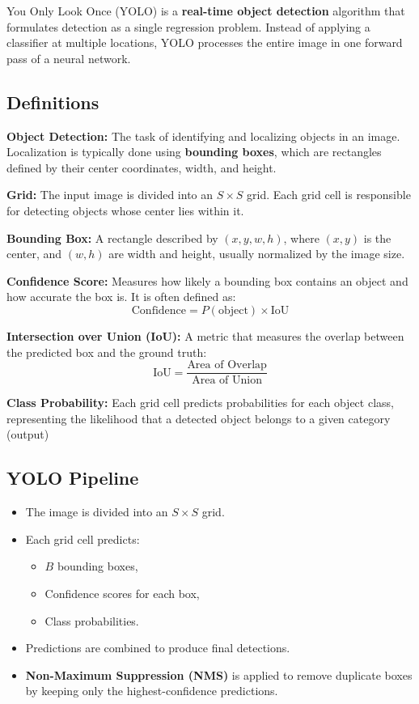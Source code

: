 \documentclass[10pt, a4paper]{article}
\begin{document}
You Only Look Once (YOLO) is a \textbf{real-time object detection} algorithm that formulates detection as a single regression problem. Instead of applying a classifier at multiple locations, YOLO processes the entire image in one forward pass of a neural network.

\subsection{Definitions}

\textbf{Object Detection:} The task of identifying and localizing objects in an image. Localization is typically done using \textbf{bounding boxes}, which are rectangles defined by their center coordinates, width, and height.

\textbf{Grid:} The input image is divided into an $S \times S$ grid. Each grid cell is responsible for detecting objects whose center lies within it.

\textbf{Bounding Box:} A rectangle described by $(x, y, w, h)$, where $(x,y)$ is the center, and $(w,h)$ are width and height, usually normalized by the image size.

\textbf{Confidence Score:} Measures how likely a bounding box contains an object and how accurate the box is. It is often defined as:
\[
\text{Confidence} = P(\text{object}) \times \text{IoU}
\]

\textbf{Intersection over Union (IoU):} A metric that measures the overlap between the predicted box and the ground truth:
\[
\text{IoU} = \frac{\text{Area of Overlap}}{\text{Area of Union}}
\]

\textbf{Class Probability:} Each grid cell predicts probabilities for each object class, representing the likelihood that a detected object belongs to a given category (output)

\subsection{YOLO Pipeline}

\begin{itemize}
	\item The image is divided into an $S \times S$ grid.
	\item Each grid cell predicts:
	\begin{itemize}
		\item $B$ bounding boxes,
		\item Confidence scores for each box,
		\item Class probabilities.
	\end{itemize}
	\item Predictions are combined to produce final detections.
	\item \textbf{Non-Maximum Suppression (NMS)} is applied to remove duplicate boxes by keeping only the highest-confidence predictions.
\end{itemize}
\end{document}

